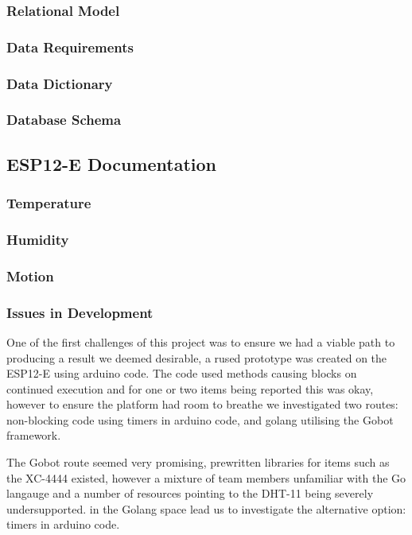\documentclass[a4paper,12pt,headings=normal]{article}
\newcounter{num}
\begin{document}
            \subsubsection{Relational Model}
            \subsubsection{Data Requirements}
            \subsubsection{Data Dictionary}
            \subsubsection{Database Schema}

        \newpage
        \subsection{ESP12-E Documentation}
            \subsubsection{Temperature}
            \subsubsection{Humidity}
            \subsubsection{Motion}
            \subsubsection{Issues in Development}
                One of the first challenges of this project was to ensure we had a viable
                path to producing a result we deemed desirable, a rused prototype was created
                on the ESP12-E using arduino code.
                The code used methods causing blocks on continued execution and for one or 
                two items being reported this was okay, however to ensure the platform had
                room to breathe we investigated two routes: non-blocking code using timers 
                in arduino code, and golang utilising the Gobot framework\cite{GoBot}.

                \medskip

                The Gobot route seemed very promising, prewritten libraries for items 
                such as the XC-4444\cite{XC-4444} existed, however a mixture of team members 
                unfamiliar with the Go langauge\cite{Golang} and a number of resources
                pointing to the DHT-11\cite{DHT11} being severely undersupported\cite{GolangDHT111Issues}.
                in the Golang space lead us to investigate the alternative option: timers 
                in arduino code.
\end{document}
